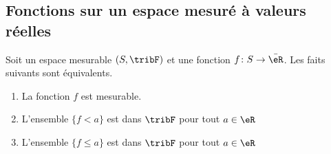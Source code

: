 \subsection{Fonctions sur un espace mesuré à valeurs réelles}

\begin{theorem}     \label{THOooWHFLooKYGsOm}
    Soit un espace mesurable \( (S,\tribF)\) et une fonction \( f\colon S\to \bar \eR\). Les faits suivants sont équivalents.
    \begin{enumerate}
        \item\label{ITEMooHAMHooYLqUhVi}
            La fonction \( f\) est mesurable.
        \item\label{ITEMooHAMHooYLqUhVii}
            L'ensemble \( \{ f<a \}\) est dans \( \tribF\) pour tout \( a\in \eR\)
        \item\label{ITEMooHAMHooYLqUhViii}
            L'ensemble \( \{ f\leq a \}\) est dans \( \tribF\) pour tout \( a\in \eR\)
    \end{enumerate}
\end{theorem}

